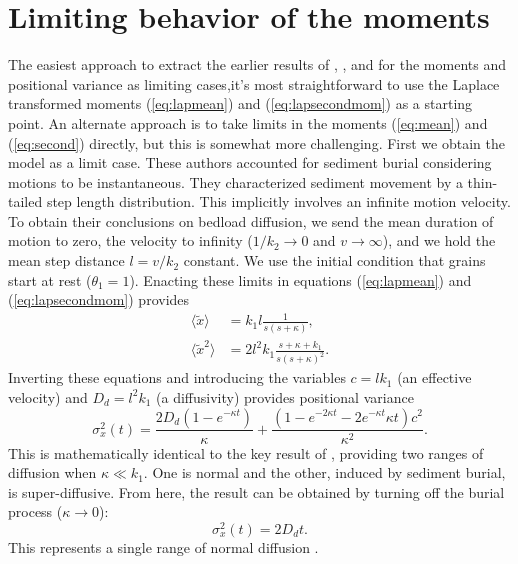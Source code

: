 \documentclass[]{agujournal2018}
\newcommand\be{\begin{equation}}
\newcommand\ee{\end{equation}}
\newcommand\bra{\langle}
\newcommand\ket{\rangle}
\begin{document}
\section{Limiting behavior of the moments}
\label{sec:appendixC}
The easiest approach to extract the earlier results of \cite{Wu2019}, \citet{Lisle1998}, and \citet{Einstein1937} for the moments and positional variance as limiting cases,it's most straightforward to use the Laplace transformed moments (\ref{eq:lapmean}) and (\ref{eq:lapsecondmom}) as a starting point.
An alternate approach is to take limits in the moments (\ref{eq:mean}) and (\ref{eq:second}) directly, but this is somewhat more challenging.
First we obtain the \citet{Wu2019} model as a limit case. 
These authors accounted for sediment burial considering motions to be instantaneous.
They characterized sediment movement by a thin-tailed step length distribution.
This implicitly involves an infinite motion velocity.
To obtain their conclusions on bedload diffusion, we send the mean duration of motion to zero, the velocity to infinity ($1/k_2\rightarrow 0$ and $v\rightarrow \infty$), and we hold the mean step distance $l = v/k_2$ constant.
We use the initial condition that grains start at rest ($\theta_1=1$).
Enacting these limits in equations (\ref{eq:lapmean}) and (\ref{eq:lapsecondmom}) provides
\begin{align}
\bra \tilde{x} \ket &= k_1l\frac{1}{s(s+\kappa)},\\
\bra \tilde{x}^2 \ket &= 2l^2k_1 \frac{s+\kappa+k_1}{s(s+\kappa)^2}.
\end{align}
Inverting these equations and introducing the variables $c=lk_1$ (an effective velocity) and $D_d = l^2k_1$ (a diffusivity) provides positional variance
\be \sigma_x^2(t) = \frac{2D_d(1-e^{-\kappa t})}{\kappa} + \frac{(1-e^{-2\kappa t}-2e^{-\kappa t}\kappa t)c^2}{\kappa^2}.\ee
This is mathematically identical to the key result of \citet{Wu2019}, providing two ranges of diffusion when $\kappa \ll k_1$. One is normal and the other, induced by sediment burial, is super-diffusive.
From here, the \citet{Einstein1937} result can be obtained by turning off the burial process ($\kappa \rightarrow 0$):
\be \sigma_x^2(t) = 2D_d t.\ee
This represents a single range of normal diffusion \citep[c.f.][]{Hubbell1964,Nakagawa1976}.
\end{document}
